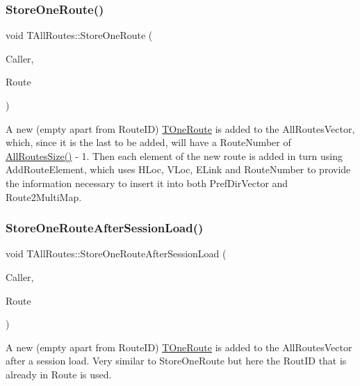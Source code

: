 \subsubsection{\texorpdfstring{Store\+One\+Route()}{StoreOneRoute()}}
{\footnotesize\ttfamily void T\+All\+Routes\+::\+Store\+One\+Route (\begin{DoxyParamCaption}\item[{int}]{Caller,  }\item[{\mbox{\hyperlink{class_t_one_route}{T\+One\+Route}} $\ast$}]{Route }\end{DoxyParamCaption})}

A new (empty apart from Route\+ID) \mbox{\hyperlink{class_t_one_route}{T\+One\+Route}} is added to the All\+Routes\+Vector, which, since it is the last to be added, will have a Route\+Number of \mbox{\hyperlink{class_t_all_routes_a438b71f3afbc2c8adb45b47f69cb3bb9}{All\+Routes\+Size()}} -\/ 1. Then each element of the new route is added in turn using Add\+Route\+Element, which uses H\+Loc, V\+Loc, E\+Link and Route\+Number to provide the information necessary to insert it into both Pref\+Dir\+Vector and Route2\+Multi\+Map. \mbox{\label{class_t_all_routes_a7bf52152ec8f71a9aa78ad4dc4f80c65}} 
\subsubsection{\texorpdfstring{Store\+One\+Route\+After\+Session\+Load()}{StoreOneRouteAfterSessionLoad()}}
{\footnotesize\ttfamily void T\+All\+Routes\+::\+Store\+One\+Route\+After\+Session\+Load (\begin{DoxyParamCaption}\item[{int}]{Caller,  }\item[{\mbox{\hyperlink{class_t_one_route}{T\+One\+Route}} $\ast$}]{Route }\end{DoxyParamCaption})}

A new (empty apart from Route\+ID) \mbox{\hyperlink{class_t_one_route}{T\+One\+Route}} is added to the All\+Routes\+Vector after a session load. Very similar to Store\+One\+Route but here the Rout\+ID that is already in Route is used. \mbox{\label{class_t_all_routes_aace498b67ccef13364a1afa1f5f15311}} 

